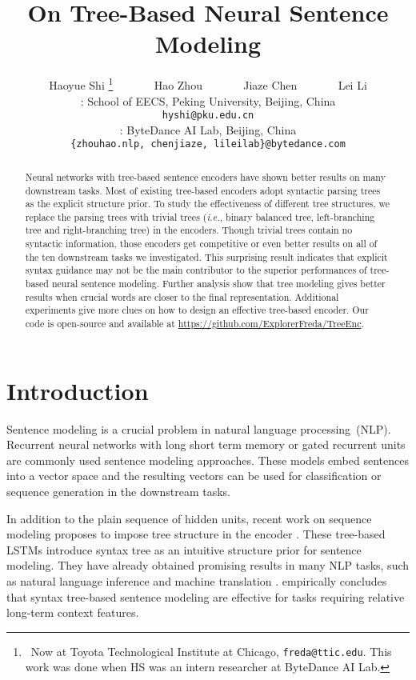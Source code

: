 \documentclass[11pt,a4paper]{article}
\title{On Tree-Based Neural Sentence Modeling}
\author{Haoyue Shi \thanks{~Now at Toyota Technological Institute at Chicago, {\tt freda@ttic.edu}. This work was done when HS was an intern researcher at ByteDance AI Lab. } ~~~~~~ Hao Zhou ~~~~~~ Jiaze Chen ~~~~~~ Lei Li \\
: School of EECS, Peking University, Beijing, China \\
{\tt hyshi@pku.edu.cn}
\\
: ByteDance AI Lab, Beijing, China \\
{\tt \{zhouhao.nlp, chenjiaze, lileilab\}@bytedance.com}}
\date{}
\begin{document}
\maketitle
\begin{abstract}
Neural networks with tree-based sentence encoders have shown better results on many downstream tasks.
Most of existing tree-based encoders adopt 
syntactic parsing trees as the explicit structure prior. 
To study the effectiveness of different tree structures, we replace the parsing trees with trivial trees (\textit{i.e.}, binary balanced tree, left-branching tree and right-branching tree) in the encoders. 
Though trivial trees contain no syntactic information, 
those encoders get competitive or even better results on all of the ten downstream tasks we investigated. 
This surprising result indicates that explicit syntax guidance may not be the main contributor to the superior performances of tree-based neural sentence modeling.
Further analysis show that tree modeling gives better results when crucial words are closer to the final representation.
Additional experiments give more clues on how to design an effective tree-based encoder.
Our code is open-source and available at \url{https://github.com/ExplorerFreda/TreeEnc}. 
\end{abstract}


\section{Introduction}

Sentence modeling is a crucial problem in natural language processing~(NLP).
Recurrent neural networks with long short term memory \cite{hochreiter1997long} or gated recurrent units  \cite{cho2014learning}
are commonly used sentence modeling approaches. 
These models embed sentences into a vector space and the resulting vectors can be used for classification or sequence generation in the downstream tasks.

In addition to the plain sequence of hidden units, recent work on sequence modeling proposes to impose tree structure 
in the encoder \cite{socher2013recursive,tai2015improved,zhu2015long}. 
These tree-based LSTMs introduce syntax tree as an intuitive structure prior for sentence modeling.
They have already obtained promising results in many NLP tasks, such as natural language inference \cite{bowman2016fast,chen2017enhanced} and machine translation \cite{eriguchi2016tree,chen2017improved,chen2017neural,P17-2092}.
 empirically concludes that syntax tree-based sentence modeling are effective for tasks requiring relative long-term context features.
\end{document}
